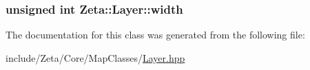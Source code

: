 \hypertarget{classZeta_1_1Layer_a31e7f0ffc14b15386dfe57954c0b3014}{
\subsubsection[{width}]{\setlength{\rightskip}{0pt plus 5cm}unsigned int Zeta\+::\+Layer\+::width\hspace{0.3cm}{\ttfamily [protected]}}}\label{classZeta_1_1Layer_a31e7f0ffc14b15386dfe57954c0b3014}


The documentation for this class was generated from the following file\+:\begin{DoxyCompactItemize}
\item 
include/\+Zeta/\+Core/\+Map\+Classes/\hyperlink{Layer_8hpp}{Layer.\+hpp}\end{DoxyCompactItemize}
